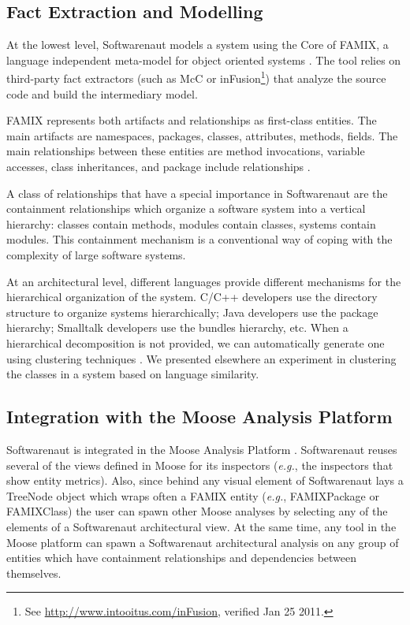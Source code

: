 \documentclass[preprint,12pt]{elsarticle}
\newcommand\on[1]{\nbc{ON}{#1}{red}} %
\newcommand{\eg}{\emph{e.g.},\xspace}
\begin{document}
\on{strange section heading}

\subsection {Fact Extraction and Modelling} \label{sec:facts}

At the lowest level, Softwarenaut models a system using the Core of FAMIX, a language independent meta-model for object oriented systems \cite{tichelaar-thesis}. The tool relies on third-party fact extractors (such as McC \cite{pepi-mcc} or inFusion\footnote{See \url{http://www.intooitus.com/inFusion}, verified Jan 25 2011.}) that analyze the source code and build the intermediary model.

FAMIX represents both artifacts and relationships as first-class entities. The main artifacts are namespaces, packages, classes, attributes, methods, fields. The main relationships between these entities are method invocations, variable accesses, class inheritances, and package include relationships \cite{tichelaar-thesis}.

A class of relationships that have a special importance in Softwarenaut are the containment relationships which organize a software system into a vertical hierarchy: classes contain methods, modules contain classes, systems contain modules. This containment mechanism is a {conventional} way of coping with the complexity of large software systems.

At an architectural level, different languages provide different mechanisms for the hierarchical organization of the system. C/C++ developers use the directory structure to organize systems hierarchically; Java developers use the package hierarchy; Smalltalk developers use the bundles hierarchy, etc. 
When a hierarchical decomposition is not provided, we can automatically generate one using clustering techniques \cite{koschke-thesis}. We presented elsewhere an experiment in clustering the classes in a system based on language similarity\cite{Lung05a}.

\subsection {Integration with the Moose Analysis Platform}


Softwarenaut is integrated in the Moose Analysis Platform \cite{nier-story}. Softwarenaut reuses several of the views defined in Moose for its inspectors (\eg the inspectors that show entity metrics). Also, since behind any visual element of Softwarenaut lays a TreeNode object which wraps often a FAMIX entity (\eg FAMIXPackage or FAMIXClass) the user can spawn other Moose analyses by selecting any of the elements of a Softwarenaut architectural view. At the same time, any tool in the Moose platform can spawn a Softwarenaut architectural analysis on any group of entities which have containment relationships and dependencies between themselves.
\end{document}
